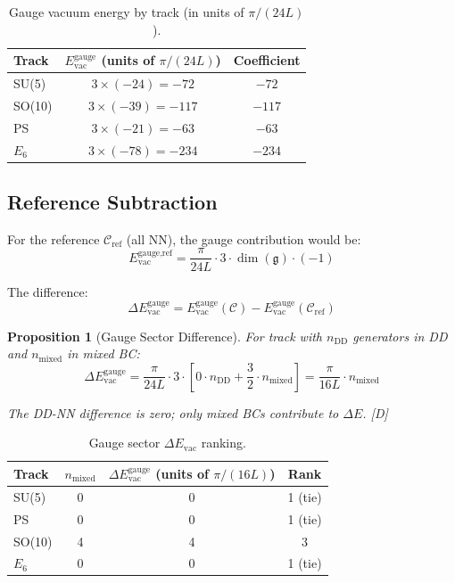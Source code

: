 \documentclass[11pt,a4paper]{article}
\newtheorem{proposition}[theorem]{Proposition}
\newcommand{\tagD}{\textcolor{blue!70!black}{[D]}}
\begin{document}
\begin{table}[h]
\centering
\begin{tabular}{lcc}
\toprule
Track & $E_{\text{vac}}^{\text{gauge}}$ (units of $\pi/(24L)$) & Coefficient \\
\midrule
SU(5) & $3 \times (-24) = -72$ & $-72$ \\
SO(10) & $3 \times (-39) = -117$ & $-117$ \\
PS & $3 \times (-21) = -63$ & $-63$ \\
$E_6$ & $3 \times (-78) = -234$ & $-234$ \\
\bottomrule
\end{tabular}
\caption{Gauge vacuum energy by track (in units of $\pi/(24L)$).}
\label{tab:gauge-vac}
\end{table}

\subsection{Reference Subtraction}

For the reference $\mathcal{C}_{\text{ref}}$ (all NN), the gauge contribution would be:
\begin{equation}
\label{eq:ref-gauge}
E_{\text{vac}}^{\text{gauge,ref}} = \frac{\pi}{24L} \cdot 3 \cdot \dim(\mathfrak{g}) \cdot (-1)
\end{equation}

The difference:
\begin{equation}
\label{eq:diff-gauge}
\Delta E_{\text{vac}}^{\text{gauge}} = E_{\text{vac}}^{\text{gauge}}(\mathcal{C}) -
E_{\text{vac}}^{\text{gauge}}(\mathcal{C}_{\text{ref}})
\end{equation}

\begin{proposition}[Gauge Sector Difference]
\label{prop:gauge-diff}
For track with $n_{\text{DD}}$ generators in DD and $n_{\text{mixed}}$ in mixed BC:
\begin{equation}
\label{eq:gauge-diff-formula}
\Delta E_{\text{vac}}^{\text{gauge}} = \frac{\pi}{24L} \cdot 3 \cdot \left[0 \cdot n_{\text{DD}}
+ \frac{3}{2} \cdot n_{\text{mixed}}\right] = \frac{\pi}{16L} \cdot n_{\text{mixed}}
\end{equation}

The DD-NN difference is zero; only mixed BCs contribute to $\Delta E$. \tagD
\end{proposition}

\begin{table}[h]
\centering
\begin{tabular}{lccc}
\toprule
Track & $n_{\text{mixed}}$ & $\Delta E_{\text{vac}}^{\text{gauge}}$ (units of $\pi/(16L)$) & Rank \\
\midrule
SU(5) & 0 & 0 & 1 (tie) \\
PS & 0 & 0 & 1 (tie) \\
SO(10) & 4 & 4 & 3 \\
$E_6$ & 0 & 0 & 1 (tie) \\
\bottomrule
\end{tabular}
\caption{Gauge sector $\Delta E_{\text{vac}}$ ranking.}
\label{tab:delta-gauge}
\end{table}
\end{document}
